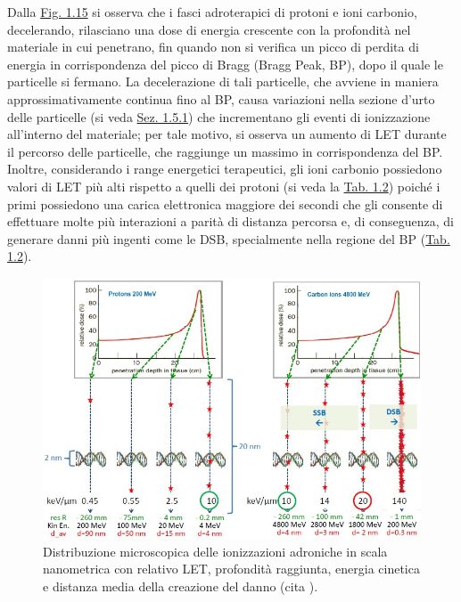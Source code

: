 \documentclass[12pt,a4paper,twoside]{report}
\begin{document}
	Dalla \hyperref[fig:proton_carbon_let]{Fig. 1.15} si osserva che i fasci adroterapici di protoni e ioni carbonio, decelerando, rilasciano una dose di energia crescente con la profondità nel materiale in cui penetrano, fin quando non si verifica un picco di perdita di energia in corrispondenza del picco di Bragg (Bragg Peak, BP), dopo il quale le particelle si fermano. La decelerazione di tali particelle, che avviene in maniera approssimativamente continua fino al BP, causa variazioni nella sezione d'urto delle particelle (si veda \hyperref[sec:sezione_urto]{Sez. 1.5.1}) che incrementano gli eventi di ionizzazione all'interno del materiale; per tale motivo, si osserva un aumento di LET durante il percorso delle particelle, che raggiunge un massimo in corrispondenza del BP. Inoltre, considerando i range energetici terapeutici, gli ioni carbonio possiedono valori di LET più alti rispetto a quelli dei protoni (si veda la \hyperref[tab:let_rbe]{Tab. 1.2}) poiché i primi possiedono una carica elettronica maggiore dei secondi che gli consente di effettuare molte più interazioni a parità di distanza percorsa e, di conseguenza, di generare danni più ingenti come le DSB, specialmente nella regione del BP (\hyperref[tab:let_rbe]{Tab. 1.2}).
	\begin{figure}[H]
		\centering
		\includegraphics[width=0.9\linewidth]{proton_carbon_let.jpg}
		\caption{Distribuzione microscopica delle ionizzazioni adroniche in scala nanometrica con relativo LET, profondità raggiunta, energia cinetica e distanza media della creazione del danno (cita
			).}
		\label{fig:proton_carbon_let}
	\end{figure}
\end{document}
